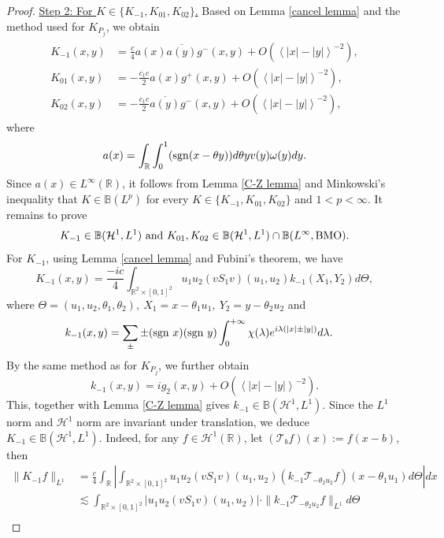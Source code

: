 \documentclass[reqno]{amsart}
\newcommand\R{\mathbb{R}}
\newcommand\B{\mathbb{B}}
\newcommand\HH{\mathcal{H}}
\newcommand\mcaT{\mathcal{T}}
\numberwithin{equation}{section}
\begin{document}
\begin{proof}
\vskip0.3cm
\underline{Step 2: For $K\in\{K_{-1},K_{01},K_{02}\}$.} Based on Lemma \ref{cancel lemma} and the method used for $K_{P_j}$, we obtain
\begin{align}\label{kernels of singular terms}
\begin{split}
    K_{-1}(x,y)&=\frac{c}{4}a(x)\overline{a(y)}g^{-}(x,y)+O(\left<|x|-|y|\right>^{-2}),\\
    K_{01}(x,y)&=-\frac{\overline{c_1}c}{2}a(x)g^{+}(x,y)+O(\left<|x|-|y|\right>^{-2}),\\
 K_{02}(x,y)&=-\frac{{c_1}c}{2}\overline{a(y)}g^{-}(x,y)+O(\left<|x|-|y|\right>^{-2}), 
\end{split}
\end{align}
where 
\begin{equation}\label{ax}
    a(x)=\int_{\R}\int_{0}^{1}({\rm sgn}(x-\theta y))d\theta yv(y)\omega(y)dy.
\end{equation}
Since $a(x)\in L^{\infty}(\R)$, it follows from Lemma \ref{C-Z lemma} and  Minkowski's inequality that $K\in \B(L^p)$ for every $K\in\{K_{-1},K_{01},K_{02}\}$ and $1<p<\infty$. It remains to prove 
$$K_{-1}\in\B(\HH^1,L^1)\ {\rm and}\  K_{01},K_{02}\in\B(\HH^1,L^1)\cap\B(L^{\infty},{\rm BMO}).$$ For $K_{-1}$, using Lemma \ref{cancel lemma} and Fubini's theorem, we have
\begin{equation}\label{kernel of Kminus1}
K_{-1}(x,y)=\frac{-ic}{4}\int_{\R^2\times[0,1]^2}^{}u_1u_2(vS_1v)(u_1,u_2)k_{-1}(X_1,Y_2)d\Theta,
\end{equation}
where $\Theta=(u_1,u_2,\theta_1,\theta_2),\ X_1=x-\theta_1u_1,\ Y_2=y-\theta_2u_2$ and 
\begin{align*}
k_{-1}(x,y)&=\sum\limits_{\pm}\pm({\rm sgn}~x)({\rm sgn}~y)\int_{0}^{+\infty}\chi(\lambda)e^{i\lambda(|x|\pm|y|)}d\lambda.
\end{align*}
By the same method as for $K_{P_j}$, we further obtain  
$$k_{-1}(x,y)=ig_2(x,y)+O(\left<|x|-|y|\right>^{-2}).$$
This, together with Lemma \ref{C-Z lemma} gives  $k_{-1}\in\B(\HH^1,L^1)$.
Since the $L^1$ norm and $\HH^{1}$ norm are invariant under translation, we deduce $K_{-1}\in\B(\HH^1,L^1)$. Indeed, for any $f\in\HH^1(\R)$, let $(\mcaT_b f)(x):=f(x-b)$, then
\begin{align*}
\|K_{-1}f\|_{L^1}&=\frac{c}{4}\int_{\R}\left|\int_{\R^2\times[0,1]^2}u_1u_2(vS_1v)(u_1,u_2)(k_{-1}\mcaT_{-\theta_2u_2} f)(x-\theta_1u_1)d\Theta\right|dx\\
&\lesssim \int_{\R^2\times[0,1]^2}|u_1u_2(vS_1v)(u_1,u_2)|\cdot\|k_{-1}\mcaT_{-\theta_2u_2} f\|_{L^1}d\Theta\\

\end{align*}
\end{proof}
\end{document}
